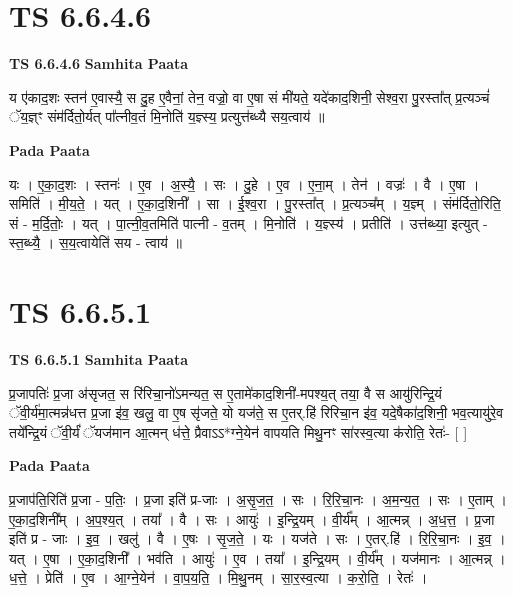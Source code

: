 \documentclass[17pt]{extarticle}
\begin{document}
\section*{ TS 6.6.4.6 }

\textbf{TS 6.6.4.6 } \newline
\textbf{Samhita Paata} \newline

य ए॑काद॒शः स्तन॑ ए॒वास्यै॒ स दु॒ह ए॒वैनां॒ तेन॒ वज्रो॒ वा ए॒षा सं मी॑यते॒ यदे॑काद॒शिनी॒ सेश्व॒रा पु॒रस्ता᳚त् प्र॒त्यञ्चं॑ ॅय॒ज्ञ्ꣳ संम॑र्दितो॒र्यत् पा᳚त्नीव॒तं मि॒नोति॑ य॒ज्ञ्स्य॒ प्रत्युत्त॑ब्ध्यै सय॒त्वाय॑ ॥ \newline

\textbf{Pada Paata} \newline

यः । ए॒का॒द॒शः । स्तनः॑ । ए॒व । अ॒स्यै॒ । सः । दु॒हे । ए॒व । ए॒ना॒म् । तेन॑ । वज्रः॑ । वै । ए॒षा । समिति॑ । मी॒य॒ते॒ । यत् । ए॒का॒द॒शिनी᳚ । सा । ई॒श्व॒रा । पु॒रस्ता᳚त् । प्र॒त्यञ्च᳚म् । य॒ज्ञ्म् । संम॑र्दितो॒रिति॒ सं - म॒र्दि॒तोः॒ । यत् । पा॒त्नी॒व॒तमिति॑ पात्नी - व॒तम् । मि॒नोति॑ । य॒ज्ञ्स्य॑ । प्रतीति॑ । उत्त॑ब्ध्या॒ इत्युत् - स्त॒ब्ध्यै॒ । स॒य॒त्वायेति॑ सय - त्वाय॑ ॥  \newline




\section*{ TS 6.6.5.1 }

\textbf{TS 6.6.5.1 } \newline
\textbf{Samhita Paata} \newline

प्र॒जापतिः॑ प्र॒जा अ॑सृजत॒ स रि॑रिचा॒नो॑ऽमन्यत॒ स ए॒तामे॑काद॒शिनी॑-मपश्य॒त् तया॒ वै स आयु॑रिन्द्रि॒यं ॅवी॒र्य॑मा॒त्मन्न॑धत्त प्र॒जा इ॑व॒ खलु॒ वा ए॒ष सृ॑जते॒ यो यज॑ते॒ स ए॒तर्.हि॑ रिरिचा॒न इ॑व॒ यदे॒षैका॑द॒शिनी॒ भव॒त्यायु॑रे॒व तये᳚न्द्रि॒यं ॅवी॒र्यं॑ ॅयज॑मान आ॒त्मन् ध॑त्ते॒ प्रैवाऽऽ*ग्ने॒येन॑ वापयति मिथु॒नꣳ सा॑रस्व॒त्या क॑रोति॒ रेतः॑- [  ] \newline

\textbf{Pada Paata} \newline

प्र॒जाप॑ति॒रिति॑ प्र॒जा - प॒तिः॒ । प्र॒जा इति॑ प्र-जाः । अ॒सृ॒ज॒त॒ । सः । रि॒रि॒चा॒नः । अ॒म॒न्य॒त॒ । सः । ए॒ताम् । ए॒का॒द॒शिनी᳚म् । अ॒प॒श्य॒त् । तया᳚ । वै । सः । आयुः॑ । इ॒न्द्रि॒यम् । वी॒र्य᳚म् । आ॒त्मन्न् । अ॒ध॒त्त॒ । प्र॒जा इति॑ प्र - जाः । इ॒व॒ । खलु॑ । वै । ए॒षः । सृ॒ज॒ते॒ । यः । यज॑ते । सः । ए॒तर्.हि॑ । रि॒रि॒चा॒नः । इ॒व॒ । यत् । ए॒षा । ए॒का॒द॒शिनी᳚ । भव॑ति । आयुः॑ । ए॒व । तया᳚ । इ॒न्द्रि॒यम् । वी॒र्य᳚म् । यज॑मानः । आ॒त्मन्न् । ध॒त्ते॒ । प्रेति॑ । ए॒व । आ॒ग्ने॒येन॑ । वा॒प॒य॒ति॒ । मि॒थु॒नम् । सा॒र॒स्व॒त्या । क॒रो॒ति॒ । रेतः॑ ।  \newline
\end{document}
